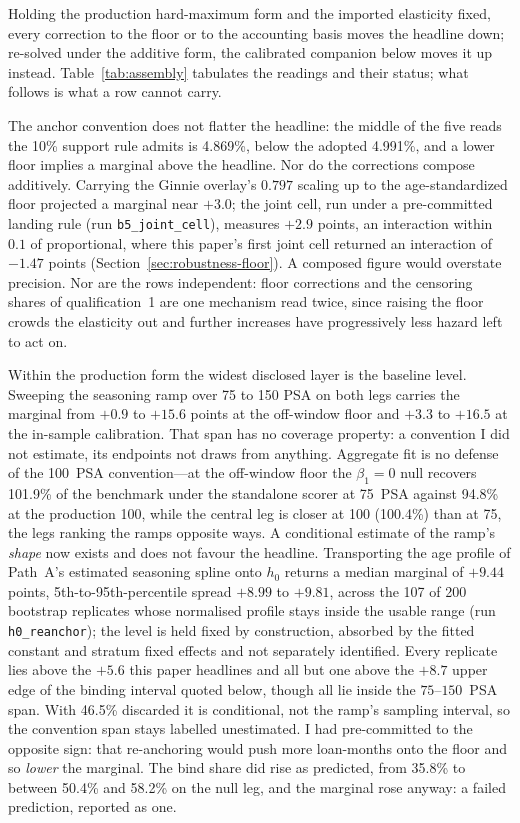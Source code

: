 Holding the production hard-maximum form and the imported elasticity fixed, every correction to the floor or to the accounting basis moves the headline down; re-solved under the additive form, the calibrated companion below moves it up instead. Table~\ref{tab:assembly} tabulates the readings and their status; what follows is what a row cannot carry.

The anchor convention does not flatter the headline: the middle of the five reads the 10\% support rule admits is 4.869\%, below the adopted 4.991\%, and a lower floor implies a marginal above the headline. Nor do the corrections compose additively. Carrying the Ginnie overlay's $0.797$ scaling up to the age-standardized floor projected a marginal near $+3.0$; the joint cell, run under a pre-committed landing rule (run \texttt{b5\_joint\_cell}), measures $+2.9$ points, an interaction within $0.1$ of proportional, where this paper's first joint cell returned an interaction of $-1.47$ points (Section~\ref{sec:robustness-floor}). A composed figure would overstate precision. Nor are the rows independent: floor corrections and the censoring shares of qualification~1 are one mechanism read twice, since raising the floor crowds the elasticity out and further increases have progressively less hazard left to act on.

Within the production form the widest disclosed layer is the baseline level. Sweeping the seasoning ramp over 75 to 150 PSA on both legs carries the marginal from $+0.9$ to $+15.6$ points at the off-window floor and $+3.3$ to $+16.5$ at the in-sample calibration. That span has no coverage property: a convention I did not estimate, its endpoints not draws from anything. Aggregate fit is no defense of the 100~PSA convention---at the off-window floor the $\beta_1 = 0$ null recovers 101.9\% of the benchmark under the standalone scorer at 75~PSA against 94.8\% at the production 100, while the central leg is closer at 100 (100.4\%) than at 75, the legs ranking the ramps opposite ways. A conditional estimate of the ramp's \emph{shape} now exists and does not favour the headline. Transporting the age profile of Path~A's estimated seasoning spline onto $h_0$ returns a median marginal of $+9.44$ points, 5th-to-95th-percentile spread $+8.99$ to $+9.81$, across the 107 of 200 bootstrap replicates whose normalised profile stays inside the usable range (run \texttt{h0\_reanchor}); the level is held fixed by construction, absorbed by the fitted constant and stratum fixed effects and not separately identified. Every replicate lies above the $+5.6$ this paper headlines and all but one above the $+8.7$ upper edge of the binding interval quoted below, though all lie inside the $75$--$150$~PSA span. With 46.5\% discarded it is conditional, not the ramp's sampling interval, so the convention span stays labelled unestimated. I had pre-committed to the opposite sign: that re-anchoring would push more loan-months onto the floor and so \emph{lower} the marginal. The bind share did rise as predicted, from 35.8\% to between 50.4\% and 58.2\% on the null leg, and the marginal rose anyway: a failed prediction, reported as one.

